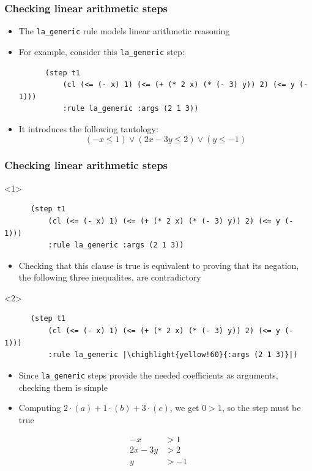 \documentclass[usepdftitle=false,aspectratio=169]{beamer}
\newcommand\vitem{\vfill\item}
\newcommand\chighlight[2]{\setlength{\fboxsep}{0pt}\colorbox{#1}{#2\strut}}
\begin{document}
\begin{frame}[fragile]
  \frametitle{Checking linear arithmetic steps}
  \begin{itemize}
    \item The \texttt{la\_generic} rule models linear arithmetic reasoning
    \vitem For example, consider this \texttt{la\_generic} step:
    \begin{verbatim}
      (step t1
          (cl (<= (- x) 1) (<= (+ (* 2 x) (* (- 3) y)) 2) (<= y (- 1)))
          :rule la_generic :args (2 1 3))
    \end{verbatim}
    \vitem It introduces the following tautology:
    $$(-x \leq 1) \lor (2x - 3y \leq 2) \lor (y \leq -1)$$
  \end{itemize}
\end{frame}
\addtocounter{framenumber}{-1}
\begin{frame}[t, fragile]
  \frametitle{Checking linear arithmetic steps}
  \begin{onlyenv}<1>
    \begin{verbatim}
      (step t1
          (cl (<= (- x) 1) (<= (+ (* 2 x) (* (- 3) y)) 2) (<= y (- 1)))
          :rule la_generic :args (2 1 3))
    \end{verbatim}
    \begin{itemize}
      \item Checking that this clause is true is equivalent to proving that its
      negation, the following three inequalites, are contradictory
    \end{itemize}
  \end{onlyenv}
  \begin{onlyenv}<2>
    \begin{verbatim}
      (step t1
          (cl (<= (- x) 1) (<= (+ (* 2 x) (* (- 3) y)) 2) (<= y (- 1)))
          :rule la_generic |\chighlight{yellow!60}{:args (2 1 3)}|)
    \end{verbatim}
    \begin{itemize}
      \item Since \texttt{la\_generic} steps provide the needed coefficients as
      arguments, checking them is simple
      \vitem Computing $2 \cdot (a) + 1 \cdot (b) + 3 \cdot (c)$, we get $0 > 1$,
      so the step must be true
    \end{itemize}
  \end{onlyenv}
  \vfill
  \begin{align*}
    -x &> 1\tag{a}\\
    2x - 3y &> 2\tag{b}\\
    y &> -1\tag{c}
  \end{align*}
\end{frame}
\end{document}
